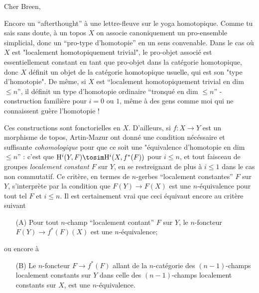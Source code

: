 Cher Breen,

\label{sec:app6}%
Encore un ``afterthought'' à une lettre-fleuve sur le yoga homotopique. Comme tu sais sans doute, à un topos $X$ on associe canoniquement un pro-ensemble simplicial, donc un ``pro-type d’homotopie'' en un sens convenable. Dans le cas où $X$ est "localement homotopiquement trivial", le pro-objet associé est essentiellement constant en tant que pro-objet dans la catégorie homotopique, donc $X$ définit un objet de la catégorie homotopique usuelle, qui est son "type d’homotopie". De même, si $X$ est ``localement homotopiquement trivial en dim $\leq n$'', il définit un type d’homotopie ordinaire ``tronqué en dim $\leq n$'' - construction familière pour $i = 0$ ou $1$, même à des gens comme moi qui ne connaissent guère l’homotopie !

Ces constructions sont fonctorielles en $X$. D’ailleurs, si $f: X \to Y$ est un morphisme de topos, Artin-Mazur ont donné une condition nécéssaire et suffisante \emph{cohomologique} pour que ce soit une "équivalence d’homotopie en dim $\leq n$'' : c’est que $\mathrm H^i(Y, F) \tosim \mathrm H^i(X, f^*(F))$ pour $i \leq n$, et tout faisceau de groupes \emph{localement constant} $F$ sur $Y$, en se restreignant de plus à $i \leq 1$ dans le cas non commutatif. Ce critère, en termes de $n$-gerbes ``localement constantes'' $F$ sur $Y$, s’interprète par la condition que $F(Y) \to F(X)$ est une $n$-équivalence pour tout tel $F$ et $i \leq n$. Il est certainement vrai que ceci équivaut encore au critère suivant 
\begin{enumerate}
\item[(A)]\label{it:App6.A} Pour tout $n$-champ ``localement contant'' $F$ sur $Y$, le $n$-foncteur $F(Y) \to f^*(F)(X)$ est une $n$-équivalence;
\end{enumerate}
ou encore à
\begin{enumerate}
\item[(B)]\label{it:App6.B} Le $n$-foncteur $F \to f^*(F)$ allant de la $n$-catégorie des $(n-1)$-champs localement constants sur $Y$ dans celle des $(n-1)$-champs localement constants sur $X$, est une $n$-équivalence.
\end{enumerate}

